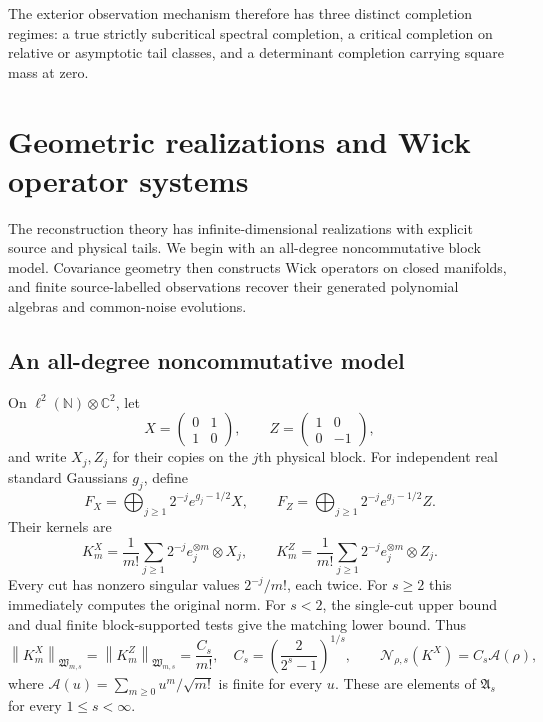 \documentclass[11pt,a4paper]{amsart}
\numberwithin{equation}{section}
\theoremstyle{definition}
\theoremstyle{remark}
\newcommand{\C}{\mathbb C}
\newcommand{\N}{\mathbb N}
\newcommand{\Wc}{\mathfrak W}
\newcommand{\Alg}{\mathfrak A}
\newcommand{\norm}[1]{\left\lVert#1\right\rVert}
\newcommand{\Nn}[2]{\mathcal N_{#1,s}(#2)}
\begin{document}
The exterior observation mechanism therefore has three distinct completion regimes: a true strictly subcritical spectral completion, a critical completion on relative or asymptotic tail classes, and a determinant completion carrying square mass at zero.


\section{Geometric realizations and Wick operator systems}\label{sec:realizations}\label{sec:wickpipeline}\label{sec:completioncomparison}
The reconstruction theory has infinite-dimensional realizations with explicit source and physical tails. We begin with an all-degree noncommutative block model. Covariance geometry then constructs Wick operators on closed manifolds, and finite source-labelled observations recover their generated polynomial algebras and common-noise evolutions.

\subsection{An all-degree noncommutative model}
On $\ell^2(\N)\otimes\C^2$, let
\[
 X=\begin{pmatrix}0&1\\1&0\end{pmatrix},\qquad
 Z=\begin{pmatrix}1&0\\0&-1\end{pmatrix},
\]
and write $X_j,Z_j$ for their copies on the $j$th physical block. For independent real standard Gaussians $g_j$, define
\begin{equation}\label{eq:fullmodel}
 F_X=\bigoplus_{j\ge1}2^{-j}e^{g_j-1/2}X,\qquad
 F_Z=\bigoplus_{j\ge1}2^{-j}e^{g_j-1/2}Z.
\end{equation}
Their kernels are
\[
 K_m^X=\frac1{m!}\sum_{j\ge1}2^{-j}e_j^{\otimes m}\otimes X_j,
 \qquad K_m^Z=\frac1{m!}\sum_{j\ge1}2^{-j}e_j^{\otimes m}\otimes Z_j.
\]
Every cut has nonzero singular values $2^{-j}/m!$, each twice. For $s\ge2$ this immediately computes the original norm. For $s<2$, the single-cut upper bound and dual finite block-supported tests give the matching lower bound. Thus
\begin{equation}\label{eq:modelnorm}
 \norm{K_m^X}_{\Wc_{m,s}}=\norm{K_m^Z}_{\Wc_{m,s}}=\frac{C_s}{m!},
 \quad C_s=\left(\frac2{2^s-1}\right)^{1/s},\qquad
 \Nn\rho{K^X}=C_s\mathcal A(\rho),
\end{equation}
where $\mathcal A(u)=\sum_{m\ge0}u^m/\sqrt{m!}$ is finite for every $u$. These are elements of $\Alg_s$ for every $1\le s<\infty$.
\end{document}
